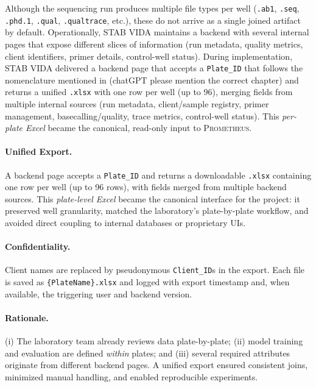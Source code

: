 Although the sequencing run produces multiple file types per well (\texttt{.ab1}, \texttt{.seq}, \texttt{.phd.1}, \texttt{.qual}, \texttt{.qualtrace}, etc.), these do not arrive as a single joined artifact by default. Operationally, STAB VIDA maintains a backend with several internal pages that expose different slices of information (run metadata, quality metrics, client identifiers, primer details, control-well status).
During implementation, STAB VIDA delivered a backend page that accepts a \texttt{Plate\_ID} that follows the nomenclature mentioned in (chatGPT please mention the correct chapter) and returns a unified \texttt{.xlsx} with one row per well (up to 96), merging fields from multiple internal sources (run metadata, client/sample registry, primer management, basecalling/quality, trace metrics, control-well status). This \emph{per-plate Excel} became the canonical, read-only input to \textsc{Prometheus}.


\paragraph{Unified Export.}
A backend page accepts a \texttt{Plate\_ID} and returns a downloadable \texttt{.xlsx} containing one row per well (up to 96 rows), with fields merged from multiple backend sources. This \emph{plate-level Excel} became the canonical interface for the project: it preserved well granularity, matched the laboratory’s plate-by-plate workflow, and avoided direct coupling to internal databases or proprietary UIs.

\paragraph{Confidentiality.}
Client names are replaced by pseudonymous \texttt{Client\_ID}s in the export. Each file is saved as \texttt{\{PlateName\}.xlsx} and logged with export timestamp and, when available, the triggering user and backend version.

\paragraph{Rationale.}
(i) The laboratory team already reviews data plate-by-plate; (ii) model training and evaluation are defined \emph{within} plates; and (iii) several required attributes originate from different backend pages. A unified export ensured consistent joins, minimized manual handling, and enabled reproducible experiments.

